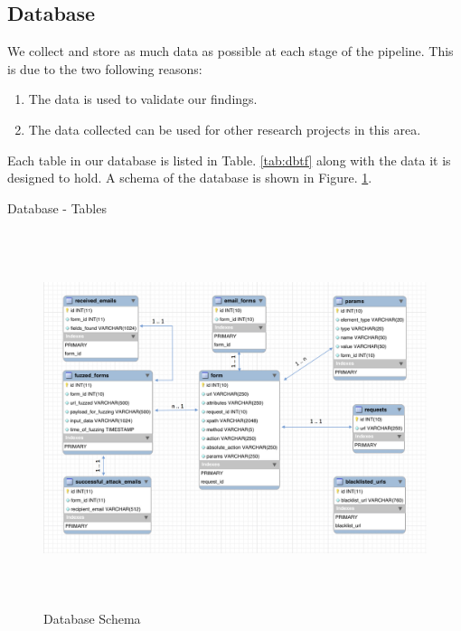 \subsection{Database}
	We collect and store as much data as possible at each stage of the pipeline. This is due to the two following reasons:
	\begin{enumerate}
		\item The data is used to validate our findings.
		\item The data collected can be used for other research projects in this area.
	\end{enumerate}
	Each table in our database is listed in Table. \ref{tab:dbtf} along with the data it is designed to hold. A schema of the database is shown in Figure. \ref{fig:dbschema}.
	
	
\begin{table}[!htbp]
	\centering
			
	\caption{Database - Tables}
	\label{tab:dbtf}
\end{table}

\begin{figure}[!htbp]
 	\centering
 	\includegraphics[width=15cm, height=11cm]{System/dbschema}
	\caption{Database Schema}
	\label{fig:dbschema}
\end{figure}
	

